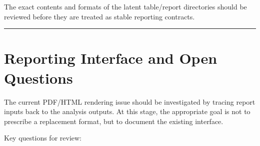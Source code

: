 \documentclass[
  letterpaper,
  DIV=11,
  numbers=noendperiod,
  openany,
  oneside]{scrreprt}
\begin{document}
The exact contents and formats of the latent table/report directories
should be reviewed before they are treated as stable reporting
contracts.

\begin{center}\rule{0.5\linewidth}{0.5pt}\end{center}

\section*{Reporting Interface and Open
Questions}\label{reporting-interface-and-open-questions}


The current PDF/HTML rendering issue should be investigated by tracing
report inputs back to the analysis outputs. At this stage, the
appropriate goal is not to prescribe a replacement format, but to
document the existing interface.

Key questions for review:
\end{document}
